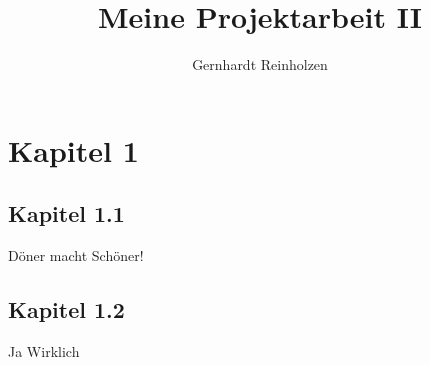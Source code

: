 
\title{Meine Projektarbeit II}
\author{Gernhardt Reinholzen}




%



\tableofcontents

 \clearpage 


\section{Kapitel 1}

\subsection{Kapitel 1.1}

Döner macht Schöner!

\subsection{Kapitel 1.2}
Ja Wirklich


